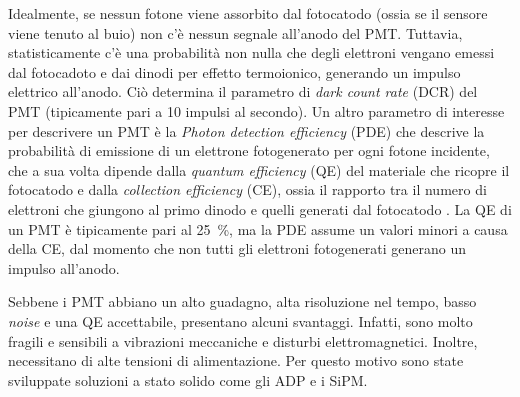 Idealmente, se nessun fotone viene assorbito dal fotocatodo (ossia se il sensore viene tenuto al buio) non c'è nessun segnale all'anodo del PMT. Tuttavia, statisticamente c'è una probabilità non nulla che degli elettroni vengano emessi dal fotocadoto e dai dinodi per effetto termoionico, generando un impulso elettrico all'anodo. Ciò determina il parametro di \textit{dark count rate} (DCR) del PMT (tipicamente pari a 10 impulsi al secondo).
Un altro parametro di interesse per descrivere un PMT è la \textit{Photon detection efficiency} (PDE) che descrive la probabilità di emissione di un elettrone fotogenerato per ogni fotone incidente, che a sua volta dipende dalla \textit{quantum efficiency} (QE) del materiale che ricopre il fotocatodo e dalla \textit{collection efficiency} (CE), ossia il rapporto tra il numero di elettroni che giungono al primo dinodo e quelli generati dal fotocatodo \cite{Hai2018}. La QE di un PMT è tipicamente pari al \SI{25}{\percent}, ma la PDE assume un valori minori a causa della CE, dal momento che non tutti gli elettroni fotogenerati generano un impulso all'anodo.

Sebbene i PMT abbiano un alto guadagno, alta risoluzione nel tempo, basso \textit{noise} e una QE accettabile, presentano alcuni svantaggi. Infatti, sono molto fragili e sensibili a vibrazioni meccaniche e disturbi elettromagnetici. Inoltre, necessitano di alte tensioni di alimentazione. Per questo motivo sono state sviluppate soluzioni a stato solido come gli ADP e i SiPM.

\newpage
